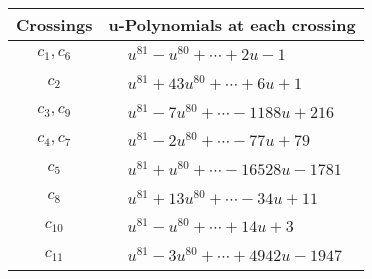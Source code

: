 \documentclass[1p]{elsarticle_modified}
\theoremstyle{definition}
\begin{document}
\begin{tabular}{m{50pt}|m{274pt}}
Crossings & \hspace{64pt}u-Polynomials at each crossing \\
\hline $$\begin{aligned}c_{1},c_{6}\end{aligned}$$&$\begin{aligned}
&u^{81}- u^{80}+\cdots+2 u-1
\end{aligned}$\\
\hline $$\begin{aligned}c_{2}\end{aligned}$$&$\begin{aligned}
&u^{81}+43 u^{80}+\cdots+6 u+1
\end{aligned}$\\
\hline $$\begin{aligned}c_{3},c_{9}\end{aligned}$$&$\begin{aligned}
&u^{81}-7 u^{80}+\cdots-1188 u+216
\end{aligned}$\\
\hline $$\begin{aligned}c_{4},c_{7}\end{aligned}$$&$\begin{aligned}
&u^{81}-2 u^{80}+\cdots-77 u+79
\end{aligned}$\\
\hline $$\begin{aligned}c_{5}\end{aligned}$$&$\begin{aligned}
&u^{81}+u^{80}+\cdots-16528 u-1781
\end{aligned}$\\
\hline $$\begin{aligned}c_{8}\end{aligned}$$&$\begin{aligned}
&u^{81}+13 u^{80}+\cdots-34 u+11
\end{aligned}$\\
\hline $$\begin{aligned}c_{10}\end{aligned}$$&$\begin{aligned}
&u^{81}- u^{80}+\cdots+14 u+3
\end{aligned}$\\
\hline $$\begin{aligned}c_{11}\end{aligned}$$&$\begin{aligned}
&u^{81}-3 u^{80}+\cdots+4942 u-1947
\end{aligned}$\\
\hline
\end{tabular}\\~\\
\end{document}
